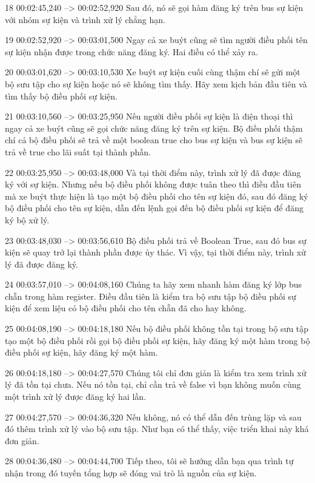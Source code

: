 18
00:02:45,240 --> 00:02:52,920
Sau đó, nó sẽ gọi hàm đăng ký trên bus sự kiện với nhóm sự kiện và trình xử lý chẳng hạn.

19
00:02:52,920 --> 00:03:01,500
Ngay cả xe buýt cũng sẽ tìm người điều phối tên sự kiện nhận được trong chức năng đăng ký.  Hai điều có thể xảy ra.

20
00:03:01,620 --> 00:03:10,530
Xe buýt sự kiện cuối cùng thậm chí sẽ gửi một bộ sưu tập cho sự kiện hoặc nó sẽ không tìm thấy.  Hãy xem kịch bản đầu tiên và tìm thấy bộ điều phối sự kiện.

21
00:03:10,560 --> 00:03:25,950
Nếu người điều phối sự kiện là điện thoại thì ngay cả xe buýt cũng sẽ gọi chức năng đăng ký trên sự kiện.  Bộ điều phối thậm chí cả bộ điều phối sẽ trả về một boolean true cho bus sự kiện và bus sự kiện sẽ trả về true cho lãi suất tại thành phần.

22
00:03:25,950 --> 00:03:48,000
Và tại thời điểm này, trình xử lý đã được đăng ký với sự kiện.  Nhưng nếu bộ điều phối không được tuân theo thì điều đầu tiên mà xe buýt thực hiện là tạo một bộ điều phối cho tên sự kiện đó, sau đó đăng ký bộ điều phối cho tên sự kiện, dẫn đến lệnh gọi đến bộ điều phối sự kiện để đăng ký bộ xử lý.

23
00:03:48,030 --> 00:03:56,610
Bộ điều phối trả về Boolean True, sau đó bus sự kiện sẽ quay trở lại thành phần được ủy thác.  Vì vậy, tại thời điểm này, trình xử lý đã được đăng ký.

24
00:03:57,010 --> 00:04:08,160
Chúng ta hãy xem nhanh hàm đăng ký lớp bus chẵn trong hàm register.  Điều đầu tiên là kiểm tra bộ sưu tập bộ điều phối sự kiện để xem liệu có bộ điều phối cho tên chẵn đã cho hay không.

25
00:04:08,190 --> 00:04:18,180
Nếu bộ điều phối không tồn tại trong bộ sưu tập tạo một bộ điều phối rồi gọi bộ điều phối sự kiện, hãy đăng ký một hàm trong bộ điều phối sự kiện, hãy đăng ký một hàm.

26
00:04:18,180 --> 00:04:27,570
Chúng tôi chỉ đơn giản là kiểm tra xem trình xử lý đã tồn tại chưa.  Nếu nó tồn tại, chỉ cần trả về false vì bạn không muốn cùng một trình xử lý được đăng ký hai lần.

27
00:04:27,570 --> 00:04:36,320
Nếu không, nó có thể dẫn đến trùng lặp và sau đó thêm trình xử lý vào bộ sưu tập.  Như bạn có thể thấy, việc triển khai này khá đơn giản.

28
00:04:36,480 --> 00:04:44,700
Tiếp theo, tôi sẽ hướng dẫn bạn qua trình tự nhận trong đó tuyến tổng hợp sẽ đóng vai trò là nguồn của sự kiện.

